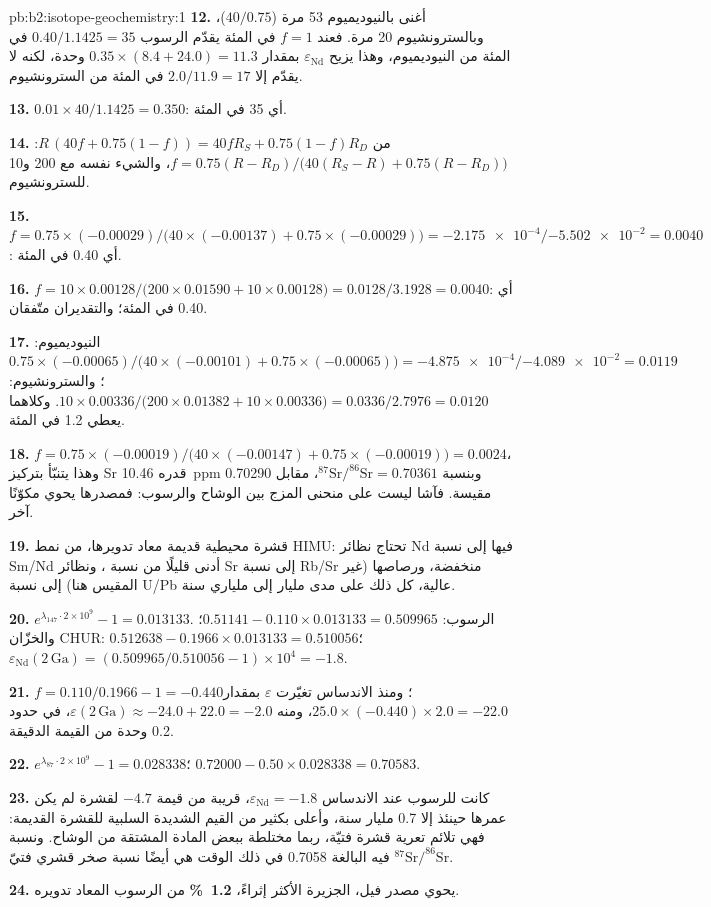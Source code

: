 \begin{solution}{pb:b2:isotope-geochemistry:1}
\textbf{12.} أغنى بالنيوديميوم 53 مرة ($40/0.75$)، وبالسترونشيوم 20 مرة. فعند $f = 1$ في المئة
يقدّم الرسوب $0.40/1.1425 = 35$ في المئة من النيوديميوم، وهذا يزيح
$\varepsilon_{\mathrm{Nd}}$ بمقدار $0.35\times(8.4 + 24.0) = 11.3$ وحدة، لكنه لا يقدّم إلا $2.0/11.9 =
17$ في المئة من السترونشيوم.

\textbf{13.} $0.01\times40/1.1425 = 0.350$: أي 35 في المئة.

\textbf{14.} من $R\,(40f + 0.75(1-f)) = 40fR_S + 0.75(1-f)R_D$:
$f = 0.75(R - R_D)/\bigl(40(R_S - R) + 0.75(R - R_D)\bigr)$، والشيء نفسه مع 200
و10 للسترونشيوم.

\textbf{15.} $f = 0.75\times(-0.00029)/\bigl(40\times(-0.00137) + 0.75\times(-0.00029)\bigr)
= \num{-2.175e-4}/\num{-5.502e-2} = 0.0040$: أي 0.40 في المئة.

\textbf{16.} $f = 10\times0.00128/\bigl(200\times0.01590 + 10\times0.00128\bigr) =
0.0128/3.1928 = 0.0040$: أي 0.40 في المئة؛ والتقديران متّفقان.

\textbf{17.} النيوديميوم: $0.75\times(-0.00065)/\bigl(40\times(-0.00101) +
0.75\times(-0.00065)\bigr) = \num{-4.875e-4}/\num{-4.089e-2} = 0.0119$؛ والسترونشيوم:
$10\times0.00336/\bigl(200\times0.01382 + 10\times0.00336\bigr) = 0.0336/2.7976 = 0.0120$.
وكلاهما يعطي 1.2 في المئة.

\textbf{18.} $f = 0.75\times(-0.00019)/\bigl(40\times(-0.00147) + 0.75\times(-0.00019)\bigr)
= 0.0024$، وهذا يتنبّأ بتركيز Sr قدره \qty{10.46}{ppm} وبنسبة $^{87}\mathrm{Sr}/^{86}\mathrm{Sr} =
0.70361$، مقابل 0.70290 مقيسة. فآشا ليست على منحنى المزج بين الوشاح والرسوب:
فمصدرها يحوي مكوّنًا آخر.

\textbf{19.} قشرة محيطية قديمة معاد تدويرها، من نمط HIMU: تحتاج نظائر Nd فيها إلى نسبة Sm/Nd
أدنى قليلًا من نسبة ، ونظائر Sr إلى نسبة Rb/Sr منخفضة،
ورصاصها (غير المقيس هنا) إلى نسبة U/Pb عالية، كل ذلك على مدى مليار إلى ملياري سنة.

\textbf{20.} $e^{\lambda_{147}\cdot2\times10^9} - 1 = 0.013133$. الرسوب: $0.51141 -
0.110\times0.013133 = 0.509965$؛ والخزّان CHUR: $0.512638 - 0.1966\times0.013133 = 0.510056$؛
$\varepsilon_{\mathrm{Nd}}(2\,\mathrm{Ga}) = (0.509965/0.510056 - 1)\times10^4 = -1.8$.

\textbf{21.} $f = 0.110/0.1966 - 1 = -0.440$؛ ومنذ الاندساس تغيّرت $\varepsilon$ بمقدار
$25.0\times(-0.440)\times2.0 = -22.0$، ومنه $\varepsilon(2\,\mathrm{Ga}) \approx -24.0 + 22.0
= -2.0$، في حدود 0.2 وحدة من القيمة الدقيقة.

\textbf{22.} $e^{\lambda_{87}\cdot2\times10^9} - 1 = 0.028338$؛
$0.72000 - 0.50\times0.028338 = 0.70583$.

\textbf{23.} كانت للرسوب عند الاندساس $\varepsilon_{\mathrm{Nd}} = -1.8$، قريبة من
قيمة $-4.7$ لقشرة لم يكن عمرها حينئذ إلا 0.7 مليار سنة، وأعلى بكثير من
القيم الشديدة السلبية للقشرة القديمة: فهي تلائم تعرية قشرة فتيّة، ربما
مختلطة ببعض المادة المشتقة من الوشاح. ونسبة $^{87}\mathrm{Sr}/^{86}\mathrm{Sr}$ فيه البالغة
0.7058 في ذلك الوقت هي أيضًا نسبة صخر قشري فتيّ.

\textbf{24.} يحوي مصدر فيل، الجزيرة الأكثر إثراءً،
\textbf{\qty[text-series-to-math=true]{1.2}{\percent}} من الرسوب المعاد تدويره.
\end{solution}

